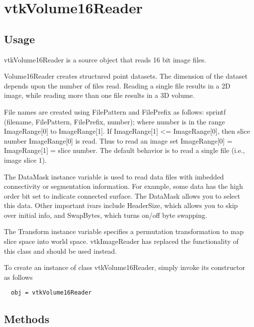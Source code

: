 \section{vtkVolume16Reader}

\subsection{Usage}

 vtkVolume16Reader is a source object that reads 16 bit image files.

 Volume16Reader creates structured point datasets. The dimension of the 
 dataset depends upon the number of files read. Reading a single file 
 results in a 2D image, while reading more than one file results in a 
 3D volume.

 File names are created using FilePattern and FilePrefix as follows:
 sprintf (filename, FilePattern, FilePrefix, number);
 where number is in the range ImageRange[0] to ImageRange[1]. If
 ImageRange[1] <= ImageRange[0], then slice number ImageRange[0] is
 read. Thus to read an image set ImageRange[0] = ImageRange[1] = slice 
 number. The default behavior is to read a single file (i.e., image slice 1).

 The DataMask instance variable is used to read data files with imbedded
 connectivity or segmentation information. For example, some data has
 the high order bit set to indicate connected surface. The DataMask allows
 you to select this data. Other important ivars include HeaderSize, which
 allows you to skip over initial info, and SwapBytes, which turns on/off
 byte swapping.

 The Transform instance variable specifies a permutation transformation
 to map slice space into world space. vtkImageReader has replaced the
 functionality of this class and should be used instead.

To create an instance of class vtkVolume16Reader, simply
invoke its constructor as follows
\begin{verbatim}
  obj = vtkVolume16Reader
\end{verbatim}
\subsection{Methods}


